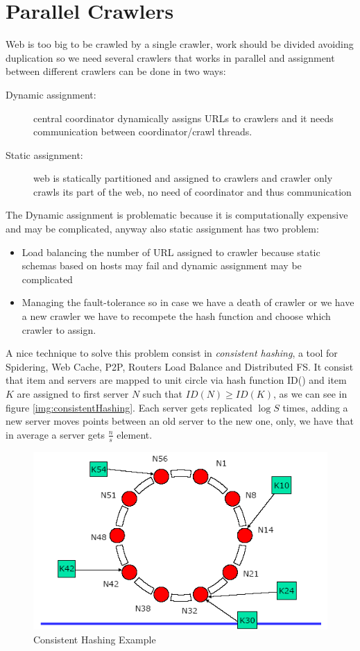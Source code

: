 \section{Parallel Crawlers}
    Web is too big to be crawled by a single crawler, work should be divided avoiding duplication so we need several crawlers that works in parallel and assignment 
    between different crawlers can be done in two ways:
    \begin{description}
	    \item [Dynamic assignment: ] central coordinator dynamically assigns URLs to crawlers and it needs communication between coordinator/crawl threads.
	    \item [Static assignment: ] web is statically partitioned and assigned to crawlers and crawler only crawls its part of the web, no need of coordinator and thus communication
    \end{description}
    The Dynamic assignment is problematic because it is computationally expensive and may be complicated, anyway also static assignment has two problem:
    \begin{itemize}
	\item Load balancing the number of URL assigned to crawler because static schemas based on hosts may fail and dynamic assignment may be complicated
	\item Managing the fault-tolerance so in case we have a death of crawler or we have a new crawler we have to recompete the hash function and choose which crawler to assign.
    \end{itemize}
    A nice technique to solve this problem consist in \emph{consistent hashing}, a tool for Spidering, Web Cache, P2P, Routers Load Balance and Distributed FS.\newline
    It consist that item and servers are mapped to unit circle via hash function ID() and item $K$ are assigned to first server $N$ such that $ID(N) \geq ID(K)$, as we can 
    see in figure \ref{img:consistentHashing}.\newline
    Each server gets replicated $\log S$ times, adding a new server moves points between an old server to the new one, only, we have that in average a server gets $\frac{n}{s}$ element.

    \begin{figure}
	\caption{Consistent Hashing Example}
	\label{img:consistenHashing}
	\includegraphics[width=\textwidth]{Images/consistentHashing}
    \end{figure}


